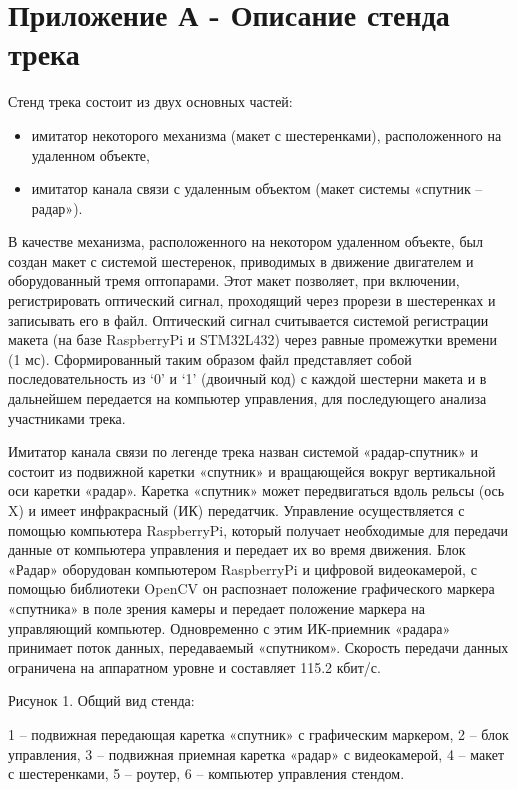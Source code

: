 \section*{Приложение А  - Описание стенда трека}

Стенд трека состоит из двух основных частей:

\begin{itemize}
    \item имитатор некоторого механизма (макет с шестеренками), расположенного на удаленном объекте,
    \item имитатор канала связи с удаленным объектом (макет системы «спутник – радар»).
\end{itemize}

В качестве механизма, расположенного на некотором удаленном объекте, был создан макет с системой шестеренок, приводимых в движение двигателем и оборудованный тремя оптопарами. Этот макет позволяет, при включении, регистрировать оптический сигнал, проходящий через прорези в шестеренках и записывать его в файл. Оптический сигнал считывается системой регистрации макета (на базе RaspberryPi и STM32L432) через равные промежутки времени (1 мс). Сформированный таким образом файл представляет собой последовательность из ‘0’ и ‘1’ (двоичный код) с каждой шестерни макета и в дальнейшем передается на компьютер управления, для последующего анализа участниками трека.

Имитатор канала связи по легенде трека назван системой «радар-спутник» и состоит из подвижной каретки «спутник» и вращающейся вокруг вертикальной оси каретки «радар». Каретка «спутник» может передвигаться вдоль рельсы (ось X) и имеет инфракрасный (ИК) передатчик. Управление осуществляется с помощью компьютера RaspberryPi, который получает необходимые для передачи данные от компьютера управления и передает их во время движения. Блок «Радар» оборудован компьютером RaspberryPi и цифровой видеокамерой, с помощью библиотеки OpenCV он распознает положение графического маркера «спутника» в поле зрения камеры и передает положение маркера на управляющий компьютер. Одновременно с этим ИК-приемник «радара» принимает поток данных, передаваемый «спутником». Скорость передачи данных ограничена на аппаратном уровне и составляет 115.2 кбит/с.


\begin{center}
    Рисунок 1. Общий вид стенда:

    1 – подвижная передающая каретка «спутник» с графическим маркером, 2 – блок управления, 3 – подвижная приемная каретка «радар» с видеокамерой, 4 – макет с шестеренками, 5 – роутер, 6 – компьютер управления стендом.
\end{center}

